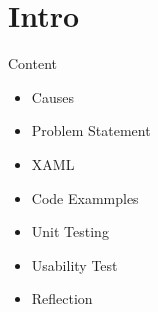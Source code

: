 \section{Intro}
\begin{frame}{Content}
    \begin{itemize}
        \item Causes
        \item Problem Statement
        \item XAML
        \item Code Exammples
        \item Unit Testing
        \item Usability Test
        \item Reflection
    \end{itemize}
\end{frame}

